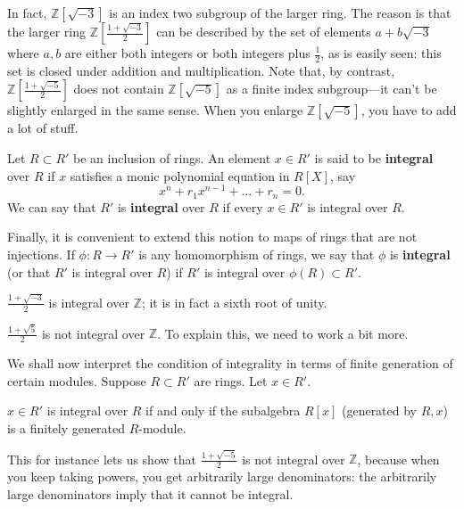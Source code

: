 In fact, $\mathbb{Z}[\sqrt{-3}]$ is an index two subgroup of the larger ring.  
The reason is that the larger ring $\mathbb{Z}[ \frac{1 + \sqrt{-3}}{2}]$ can be described by the set of elements $a +
b\sqrt{-3}$ where $a,b$ are either both integers or both integers plus
$\frac{1}{2}$, as is easily seen: this set is closed under addition and
multiplication.  
Note that, by contrast, $\mathbb{Z}[ \frac{1 + \sqrt{-5}}{2}]$ does not
contain $\mathbb{Z}[\sqrt{-5}]$ as a finite index subgroup---it can't be
slightly enlarged in the same sense. When you enlarge $\mathbb{Z}[\sqrt{-5}]$,
you have to add a lot of stuff.

\begin{definition} 
Let $R \subset R'$ be an inclusion of rings.  An element $x \in R'$
is said to be \textbf{integral} over $R$ if $x$ satisfies a monic polynomial
equation in $R[X]$, say
\[ x^n + r_1 x^{n-1} + \dots + r_n = 0.  \]
We can say that $R'$ is \textbf{integral} over $R$ if every $x \in R'$ is
integral over $R$.

Finally, it is convenient to extend this notion to maps of rings that are not
injections. If $\phi: R \to R'$ is any homomorphism of rings, we say that
$\phi$ is \textbf{integral} (or that $R'$ is integral over $R$) if $R'$ is
integral over $\phi(R) \subset R'$.
\end{definition} 

\begin{example} 
$\frac{1+\sqrt{-3}}{2}$ is integral over $\mathbb{Z}$; it is in fact a sixth
root of unity.
\end{example} 

\begin{example} 
$\frac{1+\sqrt{5}}{2}$ is not integral over $\mathbb{Z}$. To explain this, we
need to work a bit more.
\end{example}

We shall now interpret the condition of integrality in terms of finite
generation of certain modules.
Suppose $R \subset R'$ are rings.  Let $x \in R'$.  

\begin{proposition}  \label{onegeneratorintegral}
$x \in R'$ is integral over $R$ if and only if the subalgebra $R[x]$
(generated by $R, x$) is a finitely generated
$R$-module.
\end{proposition} 

This for instance lets us show that $\frac{1+\sqrt{-5}}{2}$ is not integral
over $\mathbb{Z}$, because when you keep taking powers, you get arbitrarily
large denominators: the arbitrarily large denominators imply that it cannot be
integral.

